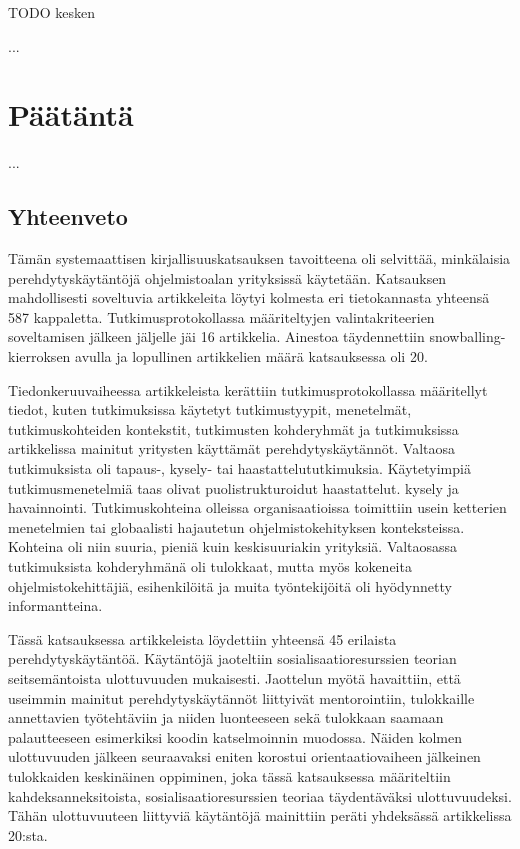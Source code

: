 \documentclass[utf8]{gradu3}
\begin{document}
TODO kesken


...


\chapter{Päätäntä}
...
\section{Yhteenveto}

Tämän systemaattisen kirjallisuuskatsauksen tavoitteena oli selvittää, minkälaisia perehdytyskäytäntöjä ohjelmistoalan yrityksissä käytetään. Katsauksen mahdollisesti soveltuvia artikkeleita löytyi kolmesta eri tietokannasta yhteensä 587 kappaletta. Tutkimusprotokollassa määriteltyjen valintakriteerien soveltamisen jälkeen jäljelle jäi 16 artikkelia. Ainestoa täydennettiin snowballing-kierroksen avulla ja lopullinen artikkelien määrä katsauksessa oli 20.

Tiedonkeruuvaiheessa artikkeleista kerättiin tutkimusprotokollassa määritellyt tiedot, kuten tutkimuksissa käytetyt tutkimustyypit, menetelmät, tutkimuskohteiden kontekstit, tutkimusten kohderyhmät ja tutkimuksissa artikkelissa mainitut yritysten käyttämät perehdytyskäytännöt. Valtaosa tutkimuksista oli tapaus-, kysely- tai haastattelututkimuksia. Käytetyimpiä tutkimusmenetelmiä taas olivat puolistrukturoidut haastattelut. kysely ja havainnointi. Tutkimuskohteina olleissa organisaatioissa toimittiin usein ketterien menetelmien tai globaalisti hajautetun ohjelmistokehityksen  konteksteissa. Kohteina oli niin suuria, pieniä kuin keskisuuriakin yrityksiä. Valtaosassa tutkimuksista kohderyhmänä oli tulokkaat, mutta myös kokeneita ohjelmistokehittäjiä, esihenkilöitä ja muita työntekijöitä oli hyödynnetty informantteina. 

Tässä katsauksessa artikkeleista löydettiin yhteensä 45 erilaista perehdytyskäytäntöä. Käytäntöjä jaoteltiin sosialisaatioresurssien teorian seitsemäntoista ulottuvuuden mukaisesti. Jaottelun myötä havaittiin, että useimmin mainitut perehdytyskäytännöt liittyivät mentorointiin, tulokkaille annettavien työtehtäviin ja niiden luonteeseen sekä tulokkaan saamaan palautteeseen esimerkiksi koodin katselmoinnin muodossa. Näiden kolmen ulottuvuuden jälkeen seuraavaksi eniten korostui orientaatiovaiheen jälkeinen tulokkaiden keskinäinen oppiminen, joka tässä katsauksessa määriteltiin kahdeksanneksitoista, sosialisaatioresurssien teoriaa täydentäväksi ulottuvuudeksi. Tähän ulottuvuuteen liittyviä käytäntöjä mainittiin peräti yhdeksässä artikkelissa 20:sta.
\end{document}
